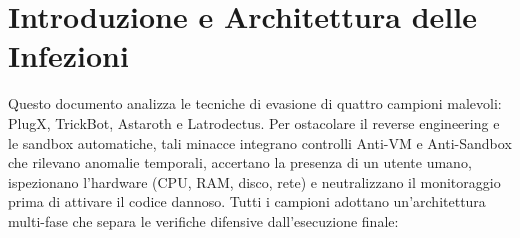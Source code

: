 \documentclass[11pt, a4paper]{article}
\begin{document}
	\tableofcontents
	\newpage
	
	\section{Introduzione e Architettura delle Infezioni}
	
	Questo documento analizza le tecniche di evasione di quattro campioni malevoli: PlugX, TrickBot, Astaroth e Latrodectus. Per ostacolare il reverse engineering e le sandbox automatiche, tali minacce integrano controlli Anti-VM e Anti-Sandbox che rilevano anomalie temporali, accertano la presenza di un utente umano, ispezionano l'hardware (CPU, RAM, disco, rete) e neutralizzano il monitoraggio prima di attivare il codice dannoso. Tutti i campioni adottano un'architettura multi-fase che separa le verifiche difensive dall'esecuzione finale:
	
\end{document}
